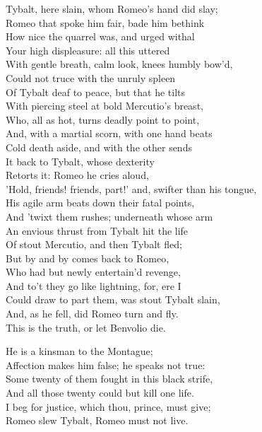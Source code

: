 \begin{speech}
Tybalt, here slain, whom Romeo's hand did slay; \\

Romeo that spoke him fair, bade him bethink \\
How nice the quarrel was, and urged withal \\
Your high displeasure: all this uttered \\
With gentle breath, calm look, knees humbly bow'd, \\
Could not truce with the unruly spleen \\
Of Tybalt deaf to peace, but that he tilts \\
With piercing steel at bold Mercutio's breast, \\
Who, all as hot, turns deadly point to point, \\
And, with a martial scorn, with one hand beats \\
Cold death aside, and with the other sends \\
It back to Tybalt, whose dexterity \\
Retorts it: Romeo he cries aloud, \\
'Hold, friends! friends, part!' and, swifter than his tongue, \\

His agile arm beats down their fatal points, \\
And 'twixt them   rushes; underneath whose arm \\
An envious thrust from Tybalt hit the life \\
Of stout Mercutio, and then Tybalt fled; \\
But by and by comes back to Romeo, \\
Who had but newly entertain'd revenge, \\
And to't they go like lightning, for, ere I \\
Could draw to part them, was stout Tybalt slain, \\
And, as he fell, did Romeo turn and fly. \\
This is the truth, or let Benvolio die. \\
\end{speech}
\begin{speech}
He is a kinsman to the Montague; \\
Affection makes him false; he speaks not true: \\
Some twenty of them   fought in this black strife, \\
And all those twenty could but kill one life. \\
I beg for justice, which thou, prince, must give; \\
Romeo slew Tybalt, Romeo must not live. \\
\end{speech}

